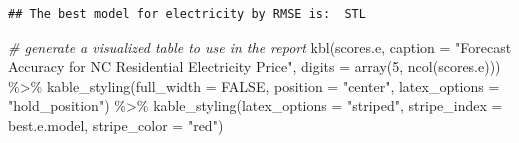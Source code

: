 \documentclass[
]{article}
\newenvironment{Shaded}{\begin{snugshade}}{\end{snugshade}}
\newcommand{\AttributeTok}[1]{\textcolor[rgb]{0.77,0.63,0.00}{#1}}
\newcommand{\CommentTok}[1]{\textcolor[rgb]{0.56,0.35,0.01}{\textit{#1}}}
\newcommand{\ConstantTok}[1]{\textcolor[rgb]{0.00,0.00,0.00}{#1}}
\newcommand{\DecValTok}[1]{\textcolor[rgb]{0.00,0.00,0.81}{#1}}
\newcommand{\FunctionTok}[1]{\textcolor[rgb]{0.00,0.00,0.00}{#1}}
\newcommand{\NormalTok}[1]{#1}
\newcommand{\OtherTok}[1]{\textcolor[rgb]{0.56,0.35,0.01}{#1}}
\newcommand{\SpecialCharTok}[1]{\textcolor[rgb]{0.00,0.00,0.00}{#1}}
\newcommand{\StringTok}[1]{\textcolor[rgb]{0.31,0.60,0.02}{#1}}
\begin{document}
\begin{Shaded}
\end{Shaded}

\begin{verbatim}
## The best model for electricity by RMSE is:  STL
\end{verbatim}

\begin{Shaded}
\begin{Highlighting}[]
\CommentTok{\# generate a visualized table to use in the report}
\FunctionTok{kbl}\NormalTok{(scores.e,}
    \AttributeTok{caption =} \StringTok{"Forecast Accuracy for NC Residential Electricity Price"}\NormalTok{,}
    \AttributeTok{digits =} \FunctionTok{array}\NormalTok{(}\DecValTok{5}\NormalTok{, }\FunctionTok{ncol}\NormalTok{(scores.e))) }\SpecialCharTok{\%\textgreater{}\%} 
  \FunctionTok{kable\_styling}\NormalTok{(}\AttributeTok{full\_width =} \ConstantTok{FALSE}\NormalTok{, }\AttributeTok{position =} \StringTok{"center"}\NormalTok{, }
                \AttributeTok{latex\_options =} \StringTok{"hold\_position"}\NormalTok{) }\SpecialCharTok{\%\textgreater{}\%} 
  \FunctionTok{kable\_styling}\NormalTok{(}\AttributeTok{latex\_options =} \StringTok{"striped"}\NormalTok{, }
                \AttributeTok{stripe\_index =}\NormalTok{ best.e.model,}
                \AttributeTok{stripe\_color =} \StringTok{"red"}\NormalTok{)}
\end{Highlighting}
\end{Shaded}
\end{document}
